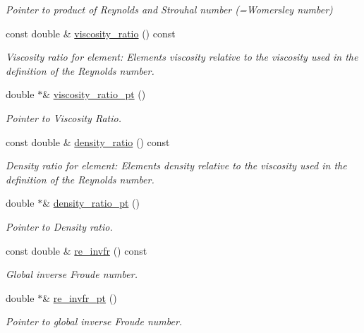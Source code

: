 \begin{DoxyCompactItemize}
\begin{DoxyCompactList}\small\item\em Pointer to product of Reynolds and Strouhal number (=Womersley number) \end{DoxyCompactList}\item 
const double \& \hyperlink{classoomph_1_1PolarNavierStokesEquations_a3a7facdf213898283bd83269abb0d9bb}{viscosity\+\_\+ratio} () const
\begin{DoxyCompactList}\small\item\em Viscosity ratio for element\+: Element\textquotesingle{}s viscosity relative to the viscosity used in the definition of the Reynolds number. \end{DoxyCompactList}\item 
double $\ast$\& \hyperlink{classoomph_1_1PolarNavierStokesEquations_a86085e439965306219fb225613fab9c0}{viscosity\+\_\+ratio\+\_\+pt} ()
\begin{DoxyCompactList}\small\item\em Pointer to Viscosity Ratio. \end{DoxyCompactList}\item 
const double \& \hyperlink{classoomph_1_1PolarNavierStokesEquations_ae67bc1e47d39854ade1e5ae6a83205b9}{density\+\_\+ratio} () const
\begin{DoxyCompactList}\small\item\em Density ratio for element\+: Element\textquotesingle{}s density relative to the viscosity used in the definition of the Reynolds number. \end{DoxyCompactList}\item 
double $\ast$\& \hyperlink{classoomph_1_1PolarNavierStokesEquations_a396d396427f8ef3428ec23cf2519f2db}{density\+\_\+ratio\+\_\+pt} ()
\begin{DoxyCompactList}\small\item\em Pointer to Density ratio. \end{DoxyCompactList}\item 
const double \& \hyperlink{classoomph_1_1PolarNavierStokesEquations_a4786ce3f5ede7e3a0ad523b5aaa19ee2}{re\+\_\+invfr} () const
\begin{DoxyCompactList}\small\item\em Global inverse Froude number. \end{DoxyCompactList}\item 
double $\ast$\& \hyperlink{classoomph_1_1PolarNavierStokesEquations_a82c26b8b7f30e36afda0e1ca5f335edb}{re\+\_\+invfr\+\_\+pt} ()
\begin{DoxyCompactList}\small\item\em Pointer to global inverse Froude number. \end{DoxyCompactList}\item 

\end{DoxyCompactItemize}
